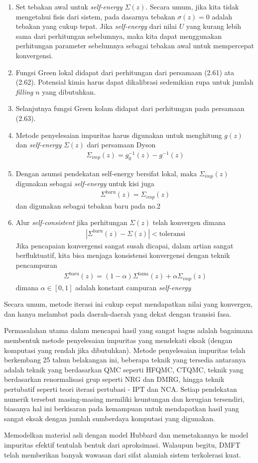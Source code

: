 \begin{enumerate}
\item Set tebakan awal untuk \textit{self-energy} $\Sigma(z)$. Secara umum, jika kita tidak mengetahui fisis dari sistem, pada dasarnya tebakan $\sigma(z) = 0$ adalah tebakan yang cukup tepat. Jika \textit{self-energy} dari nilai $U$ yang kurang lebih sama dari perhitungan sebelumnya, maka kita dapat menggunakan  perhitungan parameter sebelumnya sebagai tebakan awal untuk mempercepat konvergensi.
\item Fungsi Green lokal didapat dari perhitungan dari persamaan (2.61) ata (2.62). Potensial kimia harus dapat dikalibrasi sedemikian rupa untuk jumlah \textit{filling} $n$ yang dibutuhkan.
\item Selanjutnya fungsi Green kolam didapat dari perhitungan pada persamaan (2.63).
\item Metode penyelesaian impuritas harus digunakan untuk menghitung $g(z)$ dan \textit{self-energy} $\Sigma(z)$ dari persamaan Dyson
\begin{align}
\Sigma_{imp}(z) = g^{-1}_0(z) - g^{-1}(z)
\end{align}
\item Dengan asumsi pendekatan self-energy bersifat lokal, maka $\Sigma_{imp}(z)$ digunakan sebagai \textit{self-energy} untuk kisi juga
\begin{align}
\Sigma^{\text{baru}}(z) = \Sigma_{imp}(z)
\end{align}
dan digunakan sebagai tebakan baru pada no.2
\item Alur \textit{self-consistent} jika perhitungan $\Sigma(z)$ telah konvergen dimana
\begin{align}
| \Sigma^{\text{baru}}(z) - \Sigma(z) | < \text{toleransi}
\end{align}
Jika pencapaian konvergensi sangat susah dicapai, dalam artian sangat berfluktuatif, kita bisa menjaga konsistensi konvergensi dengan teknik pencampuran
\begin{align}
\Sigma^{\text{baru}}(z) = (1 - \alpha) \Sigma^\text{lama}(z) + \alpha \Sigma_{imp}(z)
\end{align}
dimana $\alpha \in [0,1]$ adalah konstant campuran \textit{self-energy}
\end{enumerate}
Secara umum, metode iterasi ini cukup cepat mendapatkan nilai yang konvergen, dan hanya melambat pada daerah-daerah yang dekat dengan transisi fasa. 

Permasalahan utama dalam mencapai hasil yang sangat bagus adalah bagaimana membentuk metode penyelesaian impuritas yang mendekati eksak (dengan komputasi yang rendah jika dibutuhkan). Metode penyelesaian impuritas telah berkembang 25 tahun belakangan ini, beberapa teknik yang tersedia antaranya adalah teknik yang berdasarkan QMC seperti HFQMC\cite{hfqmc}, CTQMC\cite{ctqmc}, teknik yang berdasarkan renormalisasi grup seperti NRG\cite{nrg} dan DMRG\cite{dmrg}, hingga teknik pertubatif seperti teori iterasi pertubasi - IPT\cite{ipt} dan NCA\cite{nca}. Setiap pendekatan numerik tersebut masing-masing memiliki keuntungan dan kerugian tersendiri, biasanya hal ini berkisaran pada kemampuan untuk mendapatkan hasil yang sangat eksak dengan jumlah sumberdaya komputasi yang digunakan.

Memodelkan material asli dengan model Hubbard dan memetakannya ke model impuritas efektif tentulah bentuk dari aproksimasi. Walaupun begitu, DMFT telah memberikan banyak wawasan dari sifat alamiah sistem terkolerasi kuat.